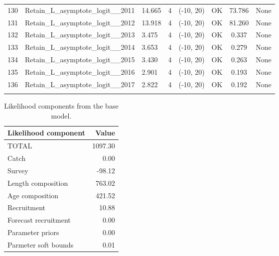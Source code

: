 \documentclass[12pt,]{article}
\begin{document}
\begin{landscape}
\begin{longtable}{lp{2.5in}lrcccl}
  130 & Retain\_L\_asymptote\_logit\_\_2011 & 14.665 & 4 & (-10, 20) & OK & 73.786 & None \\ 
  131 & Retain\_L\_asymptote\_logit\_\_2012 & 13.918 & 4 & (-10, 20) & OK & 81.260 & None \\ 
  132 & Retain\_L\_asymptote\_logit\_\_2013 & 3.475 & 4 & (-10, 20) & OK & 0.337 & None \\ 
  133 & Retain\_L\_asymptote\_logit\_\_2014 & 3.653 & 4 & (-10, 20) & OK & 0.279 & None \\ 
  134 & Retain\_L\_asymptote\_logit\_\_2015 & 3.430 & 4 & (-10, 20) & OK & 0.263 & None \\ 
  135 & Retain\_L\_asymptote\_logit\_\_2016 & 2.901 & 4 & (-10, 20) & OK & 0.193 & None \\ 
  136 & Retain\_L\_asymptote\_logit\_\_2017 & 2.822 & 4 & (-10, 20) & OK & 0.192 & None \\ 
   \hline
\hline
\label{tab:model_params}
\end{longtable}
\end{landscape}

\FloatBarrier

\begin{table}[ht]
\centering
\caption{Likelihood components from the base model.} 
\label{tab:like_components}
\begin{tabular}{lr}
  \hline
Likelihood component & Value \\ 
  \hline
TOTAL & 1097.30 \\ 
  Catch & 0.00 \\ 
  Survey & -98.12 \\ 
  Length composition & 763.02 \\ 
  Age composition & 421.52 \\ 
  Recruitment & 10.88 \\ 
  Forecast recruitment & 0.00 \\ 
  Parameter priors & 0.00 \\ 
  Parmeter soft bounds & 0.01 \\ 
   \hline
\end{tabular}
\end{table}

\newpage
\end{document}
